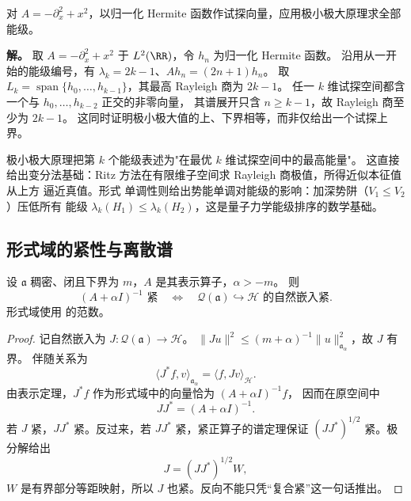 \begin{example}[谐振子的变分能级]
对 $A=-\partial_x^2+x^2$，以归一化 Hermite 函数作试探向量，应用极小极大原理求全部能级。

\textbf{解。} 取 $A=-\partial_x^2+x^2$ 于 $L^2(\RR)$，令 $h_n$ 为归一化 Hermite 函数。
沿用从一开始的能级编号，有 $\lambda_k=2k-1$、$Ah_n=(2n+1)h_n$。
取 $L_k=\operatorname{span}\{h_0,\dots,h_{k-1}\}$，其最高 Rayleigh 商为 $2k-1$。
任一 $k$ 维试探空间都含一个与 $h_0,\dots,h_{k-2}$ 正交的非零向量，
其谱展开只含 $n\ge k-1$，故 Rayleigh 商至少为 $2k-1$。
这同时证明极小极大值的上、下界相等，而非仅给出一个试探上界。
\end{example}

极小极大原理把第 $k$ 个能级表述为"在最优 $k$ 维试探空间中的最高能量"。
这直接给出变分法基础：Ritz 方法在有限维子空间求 Rayleigh 商极值，所得近似本征值从上方
逼近真值。形式 单调性则给出势能单调对能级的影响：加深势阱（$V_1\le V_2$）压低所有
能级 $\lambda_k(H_1)\le\lambda_k(H_2)$，这是量子力学能级排序的数学基础。

\subsection{形式域的紧性与离散谱}

\begin{proposition}[紧预解式与形式域的紧嵌入]
设 $\mathfrak a$ 稠密、闭且下界为 $m$，$A$ 是其表示算子，$\alpha>-m$。
则
\begin{equation}\label{eq:math-sl-compact-form-embedding}
(A+\alpha I)^{-1}\text{ 紧}
\quad\Longleftrightarrow\quad
\mathcal Q(\mathfrak a)\hookrightarrow\mathcal H
\text{ 的自然嵌入紧}.
\end{equation}
形式域使用 的范数。
\end{proposition}
\begin{proof}
记自然嵌入为 $J:\mathcal Q(\mathfrak a)\to\mathcal H$。
$\|Ju\|^2\le(m+\alpha)^{-1}\|u\|_{\mathfrak a_\alpha}^2$，故 $J$ 有界。
伴随关系为
\[
\langle J^*f,v\rangle_{\mathfrak a_\alpha}
=\langle f,Jv\rangle_{\mathcal H}.
\]
由表示定理，$J^*f$ 作为形式域中的向量恰为 $(A+\alpha I)^{-1}f$，
因而在原空间中
\[
JJ^*=(A+\alpha I)^{-1}.
\]
若 $J$ 紧，$JJ^*$ 紧。反过来，若 $JJ^*$ 紧，紧正算子的谱定理保证
$(JJ^*)^{1/2}$ 紧。极分解给出
\[
J=(JJ^*)^{1/2}W,
\]
$W$ 是有界部分等距映射，所以 $J$ 也紧。反向不能只凭“复合紧”这一句话推出。
\end{proof}


